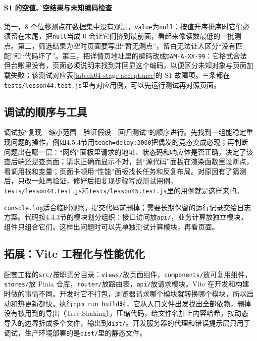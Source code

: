 \paragraph{S1 的空值、空结果与未知编码检查}第一，8 个位移测点在数据集中没有观测，\texttt{value}为\texttt{null}；按值升序排序时它们必须留在末尾，把\texttt{null}当成 0 会让它们挤到最前面，看起来像读数最低的一批测点。第二，筛选结果为空时页面要写出“暂无测点”，留白无法让人区分“没有匹配”和“代码坏了”。第三，把详情页地址里的编码改成\texttt{DAM-A-XX-99}：它格式合法但台账里没有，页面必须说明未找到并回显这个编码，以便区分未知对象与页面加载失败；该测试对应表\ref{tab:ch04-stage-acceptance}的 S1 故障项。三条都在\texttt{tests/lesson44.test.js}里有对应用例，可以先运行测试再对照页面。

\subsection{调试的顺序与工具}

调试按“复现—缩小范围—验证假设—回归测试”的顺序进行。先找到一组能稳定重现问题的操作，例如4.5.4节用\texttt{teach=delay:3000}把偶发的竞态变成必现；再判断问题出在哪一层：“网络”面板里请求的地址、状态码和响应体是否正确，决定了该查后端还是查页面；请求正确而显示不对，到“源代码”面板在渲染函数里设断点，看调用栈和变量；页面卡顿用“性能”面板找长任务和反复布局。对原因有了猜测后，只改一处再验证，修好后把复现步骤写成测试用例，\texttt{tests/lesson44.test.js}和\texttt{tests/lesson45.test.js}里的用例就是这样来的。

\texttt{console.log}适合临时观察，提交代码前删掉；需要长期保留的运行记录交给日志方案。代码按4.4.3节的模块划分组织：接口访问放\texttt{api/}，业务计算放独立模块，组件只组合它们。这样出问题时可以先单独测试计算模块，再看页面。

\subsection{拓展：Vite 工程化与性能优化}

配套工程的\texttt{src/}按职责分目录：\texttt{views/}放页面组件，\texttt{components/}放可复用组件，\texttt{stores/}放 Pinia 仓库，\texttt{router/}放路由表，\texttt{api/}放请求模块。Vite 在开发和构建时做的事情不同。开发时它不打包，浏览器请求哪个模块就转换哪个模块，所以启动和热更新都快。执行\texttt{npm run build}时，它从入口文件出发找出全部依赖，删掉没有被用到的导出（Tree Shaking），压缩代码，给文件名加上内容哈希，按动态导入的边界拆成多个文件，输出到\texttt{dist/}。开发服务器的代理和错误提示层只用于调试，生产环境部署的是\texttt{dist/}里的静态文件。

